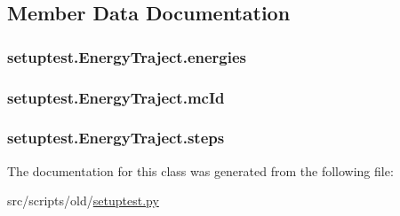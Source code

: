 \subsection{Member Data Documentation}
\hypertarget{classsetuptest_1_1_energy_traject_a42afaf404b3751ccd71132f940cca86f}{
\subsubsection[{energies}]{\setlength{\rightskip}{0pt plus 5cm}setuptest.\-Energy\-Traject.\-energies}}\label{classsetuptest_1_1_energy_traject_a42afaf404b3751ccd71132f940cca86f}
\hypertarget{classsetuptest_1_1_energy_traject_a1b72e7ba38f589bc5d8da9bdb6a2ab4a}{
\subsubsection[{mc\-Id}]{\setlength{\rightskip}{0pt plus 5cm}setuptest.\-Energy\-Traject.\-mc\-Id}}\label{classsetuptest_1_1_energy_traject_a1b72e7ba38f589bc5d8da9bdb6a2ab4a}
\hypertarget{classsetuptest_1_1_energy_traject_a1b6ed50b43cacca55b035725f61209d4}{
\subsubsection[{steps}]{\setlength{\rightskip}{0pt plus 5cm}setuptest.\-Energy\-Traject.\-steps}}\label{classsetuptest_1_1_energy_traject_a1b6ed50b43cacca55b035725f61209d4}


The documentation for this class was generated from the following file\-:\begin{DoxyCompactItemize}
\item 
src/scripts/old/\hyperlink{setuptest_8py}{setuptest.\-py}\end{DoxyCompactItemize}
